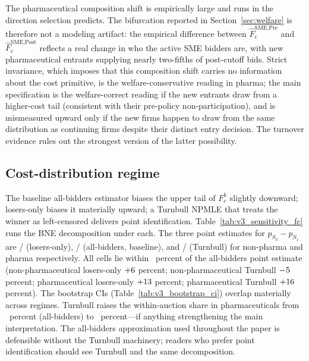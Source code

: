

The pharmaceutical composition shift is empirically large and runs in the direction selection predicts. The bifurcation reported in Section~\ref{sec:welfare} is therefore not a modeling artifact: the empirical difference between $\hat F_c^{\text{SME,Pre}}$ and $\hat F_c^{\text{SME,Post}}$ reflects a real change in who the active SME bidders are, with new pharmaceutical entrants supplying nearly two-fifths of post-cutoff bids. Strict invariance, which imposes that this composition shift carries no information about the cost primitive, is the welfare-conservative reading in pharma; the main specification is the welfare-correct reading if the new entrants draw from a higher-cost tail (consistent with their pre-policy non-participation), and is mismeasured upward only if the new firms happen to draw from the same distribution as continuing firms despite their distinct entry decision. The turnover evidence rules out the strongest version of the latter possibility.

\subsection{Cost-distribution regime}

The baseline all-bidders estimator biases the upper tail of $F_c^k$ slightly downward; losers-only biases it materially upward; a Turnbull NPMLE that treats the winner as left-censored delivers point identification. Table~\ref{tab:v3_sensitivity_fc} runs the BNE decomposition under each. The three point estimates for $p_{S_3} - p_{S_1}$ are \costRegimeLosersNp/\costRegimeLosersPh{} (losers-only), \costRegimeAllNp/\costRegimeAllPh{} (all-bidders, baseline), and \costRegimeTurnNp/\costRegimeTurnPh{} (Turnbull) for non-pharma and pharma respectively. All cells lie within \turnbullDeviationPct~percent of the all-bidders point estimate (non-pharmaceutical losers-only $+6$ percent; non-pharmaceutical Turnbull $-5$ percent; pharmaceutical losers-only $+13$ percent; pharmaceutical Turnbull $+16$ percent). The bootstrap CIs (Table~\ref{tab:v3_bootstrap_ci}) overlap materially across regimes. Turnbull raises the within-auction share in pharmaceuticals from \bneShareIntensPh~percent (all-bidders) to \turnPhShareUp~percent---if anything strengthening the main interpretation. The all-bidders approximation used throughout the paper is defensible without the Turnbull machinery; readers who prefer point identification should see Turnbull and the same decomposition.

